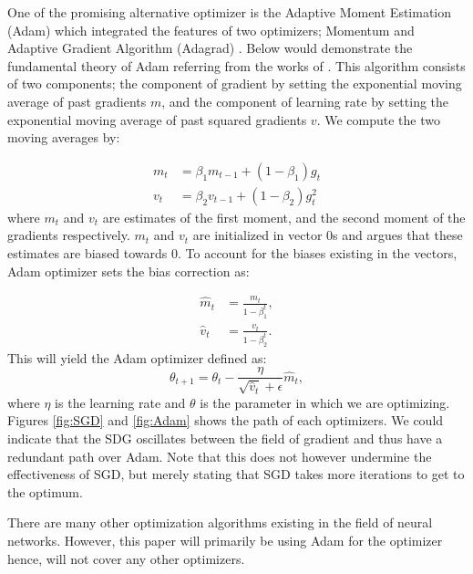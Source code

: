 One of the promising alternative optimizer is the Adaptive Moment Estimation (Adam) \citep{Adam} which integrated the features of two optimizers; Momentum \citep{Momentum} and Adaptive Gradient Algorithm (Adagrad) \citep{Adagrad}. Below would demonstrate the fundamental theory of Adam referring from the works of \citet{optimizers}. This algorithm consists of two components; the component of gradient by setting the exponential moving average of past gradients $m$, and the component of learning rate by setting the exponential moving average of past squared gradients $v$. We compute the two moving averages by:

\begin{align}
    m_{t} &=\beta_{1} m_{t-1}+\left(1-\beta_{1}\right) g_{t} \\
    v_{t} &=\beta_{2} v_{t-1}+\left(1-\beta_{2}\right) g_{t}^{2}
\end{align}
where $m_{t}$ and $v_{t}$ are estimates of the first moment, and the second moment of the gradients respectively. $m_{t}$ and $v_{t}$ are initialized in vector 0s and \citet{Adam} argues that these estimates are biased towards 0. To account for the biases existing in the vectors, Adam optimizer sets the bias correction as:

\begin{align}
    \hat{m}_{t} &=\frac{m_{t}}{1-\beta_{1}^{t}},\\
    \hat{v}_{t} &=\frac{v_{t}}{1-\beta_{2}^{t}}.
\end{align}
This will yield the Adam optimizer defined as:
\begin{equation}
    \theta_{t+1}=\theta_{t}-\frac{\eta}{\sqrt{\hat{v}_{t}}+\epsilon} \hat{m}_{t},
\end{equation}
where $\eta$ is the learning rate and $\theta$ is the parameter in which we are optimizing. Figures \ref{fig:SGD} and \ref{fig:Adam} shows the path of each optimizers. We could indicate that the SDG oscillates between the field of gradient and thus have a redundant path over Adam. Note that this does not however undermine the effectiveness of SGD, but merely stating that SGD takes more iterations to get to the optimum. 

There are many other optimization algorithms existing in the field of neural networks. However, this paper will primarily be using Adam for the optimizer hence, will not cover any other optimizers. 

